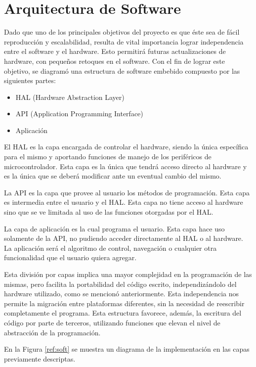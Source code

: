 \documentclass[a4paper, conference]{IEEEtran}
\begin{document}
\vspace{5 mm}

\section{Arquitectura de Software}
Dado que uno de los principales objetivos del proyecto es que éste sea de fácil reproducción y escalabilidad, resulta de vital importancia lograr independencia entre el software y el hardware. Esto permitirá futuras actualizaciones de hardware, con pequeños retoques en el software. Con el fin de lograr este objetivo, se diagramó una estructura de software embebido compuesto por las siguientes partes:
\begin{itemize}
\item HAL (Hardware Abstraction Layer)
\item API  (Application Programming Interface)
\item Aplicación 
\end{itemize}

El HAL es la capa encargada de controlar el hardware, siendo la única específica para el mismo y aportando funciones de manejo de los periféricos de microcontrolador. Esta capa es la única que tendrá acceso directo al hardware y es la única que se deberá modificar ante un eventual cambio del mismo.

La API es la capa que provee al usuario los métodos de programación. Esta capa es intermedia entre el usuario y el HAL. Esta capa no tiene acceso al hardware sino que se ve limitada al uso de las funciones otorgadas por el HAL.

La capa de aplicación es la cual programa el usuario. Esta capa hace uso solamente de la API, no pudiendo acceder directamente al HAL o al hardware. La aplicación será el algoritmo de control, navegación o cualquier otra funcionalidad que el usuario quiera agregar.

Esta división por capas implica una mayor complejidad en la programación de las mismas, pero facilita la portabilidad del código escrito, independizándolo del hardware utilizado, como se mencionó anteriormente. Esta independencia nos permite la migración entre plataformas diferentes, sin la necesidad de reescribir completamente el programa. Esta estructura favorece, además, la escritura del código por parte de terceros, utilizando funciones que elevan el nivel de abstracción de la programación.

En la Figura \ref{ref:soft} se muestra un diagrama de la implementación en las capas previamente descriptas.
\end{document}
